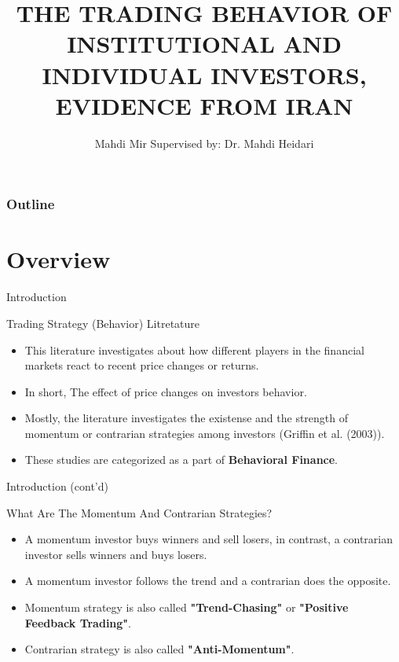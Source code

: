 \documentclass{beamer}
\title[]{\MakeUppercase{The Trading Behavior of Institutional and Individual Investors, Evidence from Iran}}
\subtitle{}
\author[]{Mahdi Mir \newline Supervised by: Dr. Mahdi Heidari}
\institute[]{TeIAS}
\date[]{}
\begin{document}
\begin{frame}
    \titlepage{}
\end{frame}

\begin{frame}[label=toc]
    \frametitle{Outline}
    \tableofcontents{}
\end{frame}


\section{Overview}


\begin{frame}{Introduction}
    \begin{block}{Trading Strategy (Behavior) Litretature}
        \begin{itemize}
            \item This literature investigates about how different players in the financial markets react to recent price changes or returns.
            \item In short, The effect of price changes on investors behavior.
            \item Mostly, the literature investigates the existense and the strength of momentum or contrarian strategies among investors (Griffin et al. (2003)).
            \item These studies are categorized as a part of \textbf{Behavioral Finance}.
        \end{itemize}
    \end{block}
\end{frame}

\begin{frame}{Introduction (cont'd)}
    \begin{block}{What Are The Momentum And Contrarian Strategies?}
        \begin{itemize}
            \item A momentum investor buys winners and sell losers, in contrast, a contrarian investor sells winners and buys losers.
            \item A momentum investor follows the trend and a contrarian does the opposite.
            \item Momentum strategy is also called \textbf{"Trend-Chasing"} or \textbf{"Positive Feedback Trading"}.
            \item Contrarian strategy is also called \textbf{"Anti-Momentum"}.
        \end{itemize}
    \end{block}
\end{frame}
\end{document}
